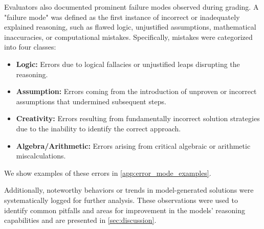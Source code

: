 Evaluators also documented prominent failure modes observed during grading. A "failure mode" was defined as the first instance of incorrect or inadequately explained reasoning, such as flawed logic, unjustified assumptions, mathematical inaccuracies, or computational mistakes. Specifically, mistakes were categorized into four classes:

\vspace{-2mm}
\begin{itemize}[leftmargin=25pt]
\setlength\itemsep{0.01em}
\item \textbf{Logic:} Errors due to logical fallacies or unjustified leaps disrupting the reasoning.
\item \textbf{Assumption:} Errors coming from the introduction of unproven or incorrect assumptions that undermined subsequent steps.
\item \textbf{Creativity:} Errors resulting from fundamentally incorrect solution strategies due to the inability to identify the correct approach.
\item \textbf{Algebra/Arithmetic:} Errors arising from critical algebraic or arithmetic miscalculations.
\end{itemize}

We show examples of these errors in \cref{app:error_mode_examples}.

Additionally, noteworthy behaviors or trends in model-generated solutions were systematically logged for further analysis. These observations were used to identify common pitfalls and areas for improvement in the models' reasoning capabilities and are presented in \cref{sec:discussion}.